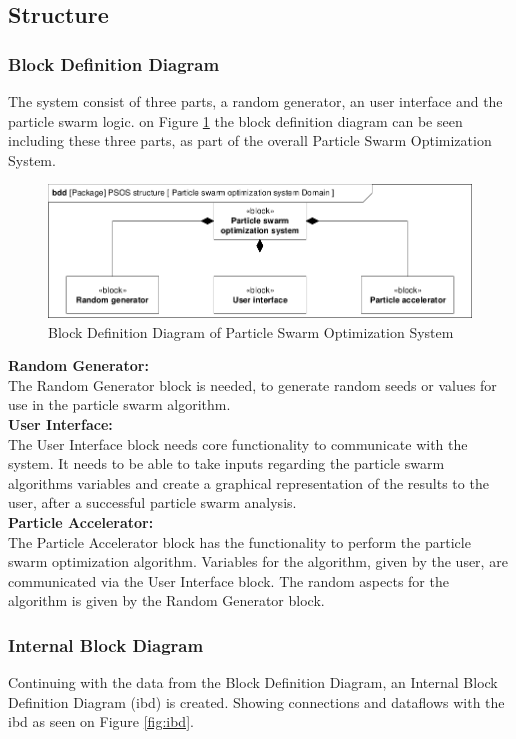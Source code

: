 \subsection{Structure} \label{requirementspecification:Structure}

\subsubsection{Block Definition Diagram}
The system consist of three parts, a random generator, an user interface and the particle swarm logic. on Figure \ref{fig:bdd} the block definition diagram can be seen including these three parts, as part of the overall Particle Swarm Optimization System.

\begin{figure}[!h]
	\centering
	\includegraphics[width=0.8\linewidth]{diagram/bdd_particle_swarm_optimization_system.pdf}
	\caption{Block Definition Diagram of Particle Swarm Optimization System}
	\label{fig:bdd}
\end{figure}

\textbf{Random Generator:}\\
The Random Generator block is needed, to generate random seeds or values for use in the particle swarm algorithm.\\

\textbf{User Interface:}\\
The User Interface block needs core functionality to communicate with the system. It needs to be able to take inputs regarding the particle swarm algorithms variables and create a graphical representation of the results to the user, after a successful particle swarm analysis.\\

\textbf{Particle Accelerator:}\\
The Particle Accelerator block has the functionality to perform the particle swarm optimization algorithm. Variables for the algorithm, given by the user, are communicated via the User Interface block. The random aspects for the algorithm is given by the Random Generator block.

\subsubsection{Internal Block Diagram}
Continuing with the data from the Block Definition Diagram, an Internal Block Definition Diagram (ibd) is created. Showing connections and dataflows with the ibd as seen on Figure \ref{fig:ibd}.

